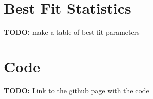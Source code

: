 \documentclass[11pt]{amsart}
\begin{document}
\newpage
\appendix

\section{Best Fit Statistics}
\textbf{TODO:} make a table of best fit parameters

\section{Code}
\textbf{TODO:} Link to the github page with the code



\end{document}
